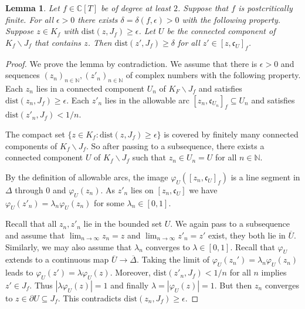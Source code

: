 \documentclass[12pt,oneside,a4]{amsart}
\newcommand{\IC}{\mathbb{C}}
\newcommand{\IN}{\mathbb{N}}
\newcounter{maincounter}
\numberwithin{maincounter}{section}
\numberwithin{equation}{section}
\newtheorem{lemma}[maincounter]{Lemma}
\renewcommand{\subset}{\subseteq}
\newcommand{\ssm}{\smallsetminus}
\begin{document}
\begin{lemma}
  \label{lem:distarclemma}
  Let $f\in\IC[T]$ be of degree at least $2$. Suppose that $f$ is
  postcritically finite. For all $\epsilon > 0$ there exists
  $\delta=\delta(f,\epsilon)>0$ with the following property. Suppose
  $z\in K_f$ with $\mathrm{dist}(z,J_f)\ge \epsilon$. Let $U$ be the
  connected component of $K_f\ssm J_f$ that contains $z$. Then
  $\mathrm{dist}(z',J_f) \ge\delta$ for all $z' \in
  [z,\mathfrak{c}_U]_f$.
\end{lemma}
\begin{proof}
  We prove the lemma
  by contradiction. We assume that there is
  $\epsilon > 0$ and sequences $(z_n)_{n\in\IN},(z'_n)_{n\in\IN}$ of
  complex numbers with
  the following property.
  Each $z_n$ lies in a connected component $U_n$
  of $K_F\ssm J_f$ and satisfies $\mathrm{dist}(z_n,J_f)\ge\epsilon$.
  Each $z'_n$ lies in the allowable arc
  $[z_n,\mathfrak{c}_{U_n}]_f\subset {U_n}$ and satisfies
  $\mathrm{dist}(z'_n,J_f)<1/n$.

  The compact set $\{z\in K_f
  :\mathrm{dist}(z,J_f)\ge\epsilon\}$ is covered by finitely many
  connected components of $K_f\ssm J_f$. So after passing to a
  subsequence, there exists a connected component $U$ of $K_f\ssm J_f$
  such that $z_n\in U_n=U$ for all $n\in\IN$.
  
  By the definition of allowable arcs, the image
  $\varphi_{U}([z_n,\mathfrak{c}_{U}]_f)$ is a line segment in
  $\Delta$ through $0$ and $\varphi_{U}(z_n)$. As $z'_n$ lies on
  $[z_n,\mathfrak{c}_U]$ we have 
  $\varphi_U(z'_n) = \lambda_n \varphi_{U}(z_n)$ for some
  $\lambda_n\in [0,1]$.
  
  Recall that all $z_n,z'_n$ lie in the bounded set ${U}$. We again pass to a
  subsequence and assume that $\lim_{n\rightarrow \infty} z_n=z$
  and  $\lim_{n\rightarrow \infty} z'_n=z'$ exist, they both lie in
  $\overline {U}$.
  Similarly, we may also assume
  that $\lambda_n$ converges to $\lambda\in [0,1]$.
  Recall that $\varphi_{U}$
  extends  to a continuous map  $\overline
  {U}\rightarrow\overline{\Delta}$.
  Taking the limit
  of $\varphi_{U}(z_n')=\lambda_n \varphi_{U}(z_n)$ leads to
  $\varphi_{U}(z')=\lambda \varphi_{U}(z)$. Moreover,
  $\mathrm{dist}(z'_n,J_f)<1/n$ for all $n$ implies $z'\in J_f$. Thus
  $|\lambda \varphi_{U}(z)|=1$ and finally $\lambda=|\varphi_U(z)|=1$.
  But then $z_n$ converges to  $z\in\partial {U}\subset J_f$. This
  contradicts  $\mathrm{dist}(z_n,J_f)\ge\epsilon$. 
\end{proof}
\end{document}
